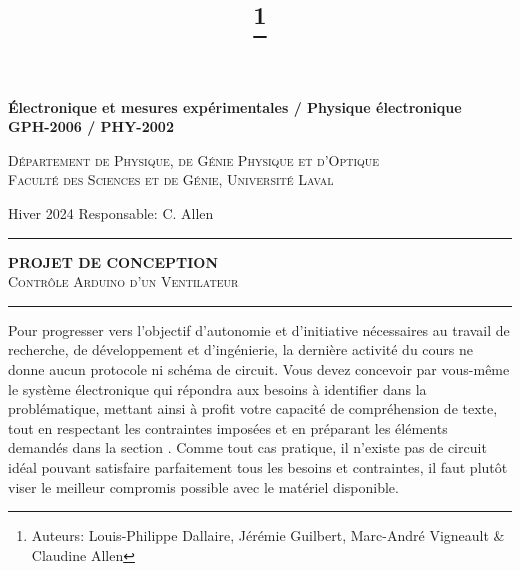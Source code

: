 \documentclass[english,french,12pt]{article}
\title{\vspace{-7em}\thanks{Auteurs: Louis-Philippe Dallaire, Jérémie Guilbert, Marc-André Vigneault \& Claudine Allen}}
\date{}
\begin{document}
\maketitle\thispagestyle{fancy}
%
%
\begin{center}
    \textbf{\large{Électronique et mesures expérimentales / Physique électronique}}\\
    \vspace{0.2em}
    \textbf{GPH-2006 / PHY-2002}

    \textsc{Département de Physique, de Génie Physique et d'Optique\\
    Faculté des Sciences et de Génie, Université Laval}
\end{center}

\vspace{-1em}
\noindent Hiver 2024 \hfill Responsable: C. Allen\par
\vspace{0.2ex}
\hrule
\vspace{0.5ex}
\centering
    \textbf{PROJET DE CONCEPTION}\\
    \textsc{Contrôle Arduino d'un Ventilateur}\par
\vspace{2ex}
\hrule
\justify
\vspace{-1ex}
Pour progresser vers l'objectif d'autonomie et d'initiative nécessaires au travail de recherche, de développement et d'ingénierie, la dernière activité du cours ne donne aucun protocole ni schéma de circuit. Vous devez concevoir par vous-même le système électronique qui répondra aux besoins à identifier dans la problématique, mettant ainsi à profit votre capacité de compréhension de texte, tout en respectant les contraintes imposées et en préparant les éléments demandés dans la section . Comme tout cas pratique, il n'existe pas de circuit idéal pouvant satisfaire parfaitement tous les besoins et contraintes, il faut plutôt viser le meilleur compromis possible avec le matériel disponible.
\end{document}
